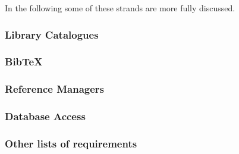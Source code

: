 In the following some of these strands are more fully discussed.


\subsubsection{Library Catalogues}



\subsubsection{BibTeX}


\subsubsection{Reference Managers}


\subsubsection{Database Access}







\subsubsection{Other lists of requirements}
\label{sec:otherreq}



